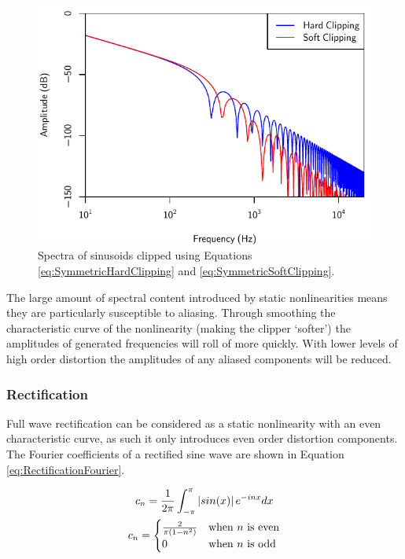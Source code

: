 			\begin{figure}[h!]
				\centering
				\includegraphics{chapter5/Images/ClippingSpectra.pdf}
				\caption{Spectra of sinusoids clipped using Equations \ref{eq:SymmetricHardClipping} and
			                 \ref{eq:SymmetricSoftClipping}.}
				\label{fig:ClippingSpectra}
			\end{figure}

			The large amount of spectral content introduced by static nonlinearities means they are
			particularly susceptible to aliasing. Through smoothing the characteristic curve of the
			nonlinearity (making the clipper `softer') the amplitudes of generated frequencies will roll of
			more quickly. With lower levels of high order distortion the amplitudes of any aliased components
			will be reduced.

		\subsubsection*{Rectification}
			Full wave rectification can be considered as a static nonlinearity with an even characteristic
			curve, as such it only introduces even order distortion components. The Fourier coefficients of a
			rectified sine wave are shown in Equation \ref{eq:RectificationFourier}.


			\begin{gather}
				c_{n} = \frac{1}{2\pi} \int_{-\pi}^{\pi} \left|sin(x)\right|e^{-inx} dx \nonumber \\
				c_{n} = \begin{cases}
					\frac{2}{\pi(1 - n^{2})} & \text{when $n$ is even} \\
					0 & \text{when $n$ is odd}
				\end{cases}
				\label{eq:RectificationFourier}
			\end{gather}

